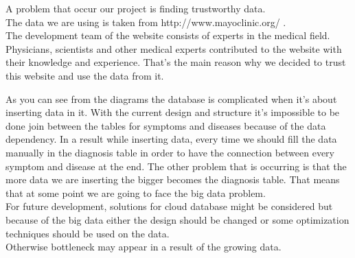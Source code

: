 A problem that occur our project is finding trustworthy data.\\
The data we are using is taken from http://www.mayoclinic.org/ .\\ 
The development team of the website consists of experts in the medical field. 
Physicians, scientists and other medical experts contributed to the website with their knowledge and experience. That’s the main reason why we decided to trust this website and use the data from it.   

As you can see from the diagrams the database is complicated when it’s about inserting data in it.
With the current design and structure it’s impossible to be done join between the tables for symptoms and diseases because of the data dependency. In a result while inserting data, every time we should fill the data manually in the diagnosis table in order to have the connection between every symptom and disease at the end. 
The other problem that is occurring is that the more data we are inserting the bigger becomes the diagnosis table. That means that at some point we are going to face the big data problem.\\For future development, solutions for cloud database might be considered but because of the big data either the design should be changed or some optimization techniques should be used on the data.\\
Otherwise bottleneck may appear in a result of the growing data. 


